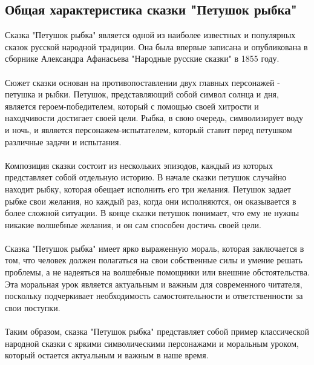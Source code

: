 \documentclass{article}
\begin{document}
\subsection{Общая характеристика сказки "{}{}Петушок рыбка"{}{}}
Сказка "{}{}Петушок рыбка"{}{} является одной из наиболее известных и популярных сказок русской народной традиции. Она была впервые записана и опубликована в сборнике Александра Афанасьева "{}{}Народные русские сказки"{}{} в 1855 году.\\
~\\
Сюжет сказки основан на противопоставлении двух главных персонажей - петушка и рыбки. Петушок, представляющий собой символ солнца и дня, является героем-победителем, который с помощью своей хитрости и находчивости достигает своей цели. Рыбка, в свою очередь, символизирует воду и ночь, и является персонажем-испытателем, который ставит перед петушком различные задачи и испытания.\\
~\\
Композиция сказки состоит из нескольких эпизодов, каждый из которых представляет собой отдельную историю. В начале сказки петушок случайно находит рыбку, которая обещает исполнить его три желания. Петушок задает рыбке свои желания, но каждый раз, когда они исполняются, он оказывается в более сложной ситуации. В конце сказки петушок понимает, что ему не нужны никакие волшебные желания, и он сам способен достичь своей цели.\\
~\\
Сказка "{}{}Петушок рыбка"{}{} имеет ярко выраженную мораль, которая заключается в том, что человек должен полагаться на свои собственные силы и умение решать проблемы, а не надеяться на волшебные помощники или внешние обстоятельства. Эта моральная урок является актуальным и важным для современного читателя, поскольку подчеркивает необходимость самостоятельности и ответственности за свои поступки.\\
~\\
Таким образом, сказка "{}{}Петушок рыбка"{}{} представляет собой пример классической народной сказки с яркими символическими персонажами и моральным уроком, который остается актуальным и важным в наше время.
\end{document}
